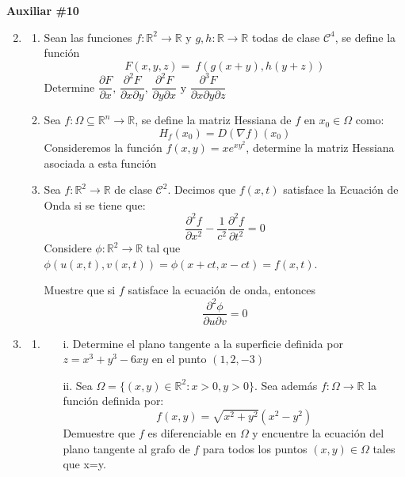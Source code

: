 \documentclass[letterpaper,11pt]{article}
\begin{document}
\begin{center}
	\LARGE \bf{Auxiliar \#10 }\\
\end{center}

\vspace{-1cm}
\begin{enumerate}\setlength{\itemsep}{0.4cm}	
\item[]

\item 

\begin{enumerate}
    \item Sean las funciones $f:\mathbb{R}^2\rightarrow\mathbb{R}$ y $g,h: \mathbb{R}\rightarrow\mathbb{R}$ todas de clase $\mathcal{C}^4$, se define la función $$F(x,y,z)=~f(g(x+y),h(y+z))$$ 
    Determine $\dfrac{\partial F }{\partial x}\text{, } \dfrac{\partial^2 F}{\partial x\partial y}\text{, } \dfrac{\partial^2 F}{\partial y \partial x}\text{ y } \dfrac{\partial^3F}{\partial x\partial y\partial z}$
    
    \item Sea $f:\Omega\subseteq\mathbb{R}^n\rightarrow\mathbb{R}$, se define la matriz Hessiana de $f$ en $x_0\in\Omega$ como:
    \[H_f(x_0)=D(\nabla f) (x_0)\]
    Consideremos la función $\displaystyle f(x,y)=xe^{xy^2}$, determine la matriz Hessiana asociada a esta función
    
    \item Sea $f:\mathbb{R}^2\rightarrow\mathbb{R}$ de clase $\mathcal{C}^2$. Decimos que $f(x,t)$ satisface la Ecuación de Onda si se tiene que:
    \[\dfrac{\partial^2f}{\partial x^2}-\dfrac{1}{c^2}\dfrac{\partial^2f}{\partial t^2}=0\]
    Considere $\phi:\mathbb{R}^2\rightarrow\mathbb{R}$ tal que $\phi(u(x,t),v(x,t))=\phi(x+ct,x-ct)=f(x,t)$.\par
    Muestre que si $f$ satisface la ecuación de onda, entonces
    \[\dfrac{\partial^2\phi}{\partial u\partial v}=0\]
\end{enumerate}

\item 
\begin{enumerate}
    \item
    \begin{itemize}
        \item[i.] Determine el plano tangente a la superficie definida por $z=x^3+y^3-6xy$ en el punto $(1,2,-3)$
        \item[ii.] 
        Sea $\Omega=\{(x,y)\in\mathbb{R}^2: x>0,y>0\}$. Sea además $f:\Omega\rightarrow\mathbb{R}$ la función definida por:
        \[f(x,y)=\sqrt{x^2+y^2}(x^2-y^2)\]
        Demuestre que $f$ es diferenciable en $\Omega$ y encuentre la ecuación del plano tangente al grafo de $f$ para todos los puntos $(x,y)\in\Omega$ tales que x=y.
    \end{itemize}
    

\end{enumerate}
\end{enumerate}
\end{document}
